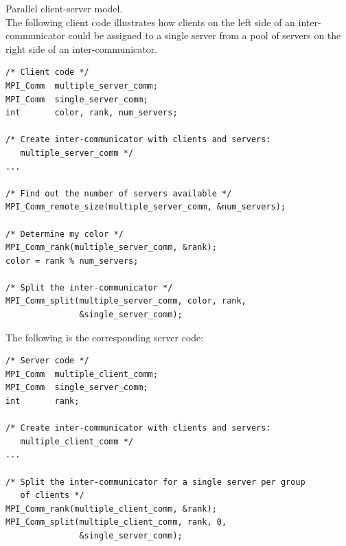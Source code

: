 \begin{example}
\label{ex:para-client-server}
%
%
Parallel client-server model.\\
The following client code illustrates how clients on the left side of an
inter-communicator could be assigned to a single server from a pool of
servers on the right side of an inter-communicator.
\begin{lstlisting}[language={[MPI]C}]
/* Client code */
MPI_Comm  multiple_server_comm;
MPI_Comm  single_server_comm;
int       color, rank, num_servers;

/* Create inter-communicator with clients and servers:
   multiple_server_comm */
...

/* Find out the number of servers available */
MPI_Comm_remote_size(multiple_server_comm, &num_servers);

/* Determine my color */
MPI_Comm_rank(multiple_server_comm, &rank);
color = rank % num_servers;

/* Split the inter-communicator */
MPI_Comm_split(multiple_server_comm, color, rank,
               &single_server_comm);
\end{lstlisting}
\noindent The following is the corresponding server code:
\begin{lstlisting}[language={[MPI]C}]
/* Server code */
MPI_Comm  multiple_client_comm;
MPI_Comm  single_server_comm;
int       rank;

/* Create inter-communicator with clients and servers:
   multiple_client_comm */
...

/* Split the inter-communicator for a single server per group
   of clients */
MPI_Comm_rank(multiple_client_comm, &rank);
MPI_Comm_split(multiple_client_comm, rank, 0,
               &single_server_comm);
\end{lstlisting}
\end{example}

